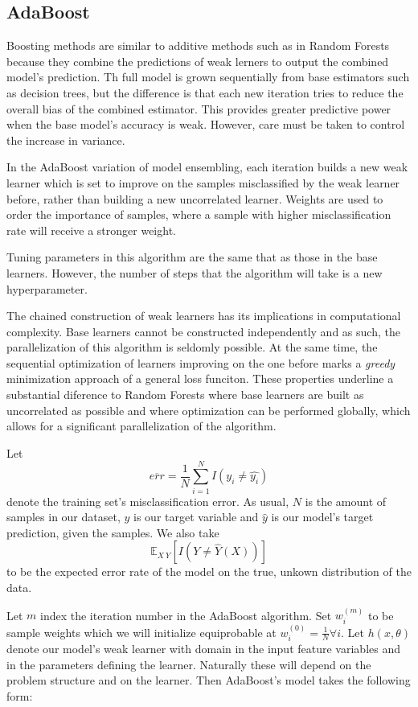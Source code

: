 \documentclass{article}%
\newcommand{\Expect}{{\mathbb{E}}}
\theoremstyle{definition}
\begin{document}
\subsection{AdaBoost}
\cite{schapire-adaBoost}

Boosting methods are similar to additive methods such as in Random Forests because they combine the predictions of weak lerners to output the combined model's prediction. Th full model is grown sequentially from base estimators such as decision trees, but the difference is that each new iteration tries to reduce the overall bias of the combined estimator. This provides greater predictive power when the base model's accuracy is weak. However, care must be taken to control the increase in variance.

In the AdaBoost variation of model ensembling, each iteration builds a new weak learner which is set to improve on the samples misclassified by the weak learner before, rather than building a new uncorrelated learner. Weights are used to order the importance of samples, where a sample with higher misclassification rate will receive a stronger weight. 

Tuning parameters in this algorithm are the same that as those in the base learners. However, the number of steps that the algorithm will take is a new hyperparameter. 

The chained construction of weak learners has its implications in computational complexity. Base learners cannot be constructed independently and as such, the parallelization of this algorithm is seldomly possible. At the same time, the sequential optimization of learners improving on the one before marks a \textit{greedy} minimization approach of a general loss funciton.
These properties underline a substantial diference to Random Forests where base learners are built as uncorrelated as possible and where optimization can be performed globally, which allows for a significant parallelization of the algorithm. 


Let 
$$\overline{err} = \frac{1}{N} \sum_{i=1}^{N} I(y_i \neq \hat{y_i})$$ \label{equation-adaBoostTrainingError}
denote the training set's misclassification error. As usual, $N$ is the amount of samples in our dataset, $y$ is our target variable and $\hat{y}$ is our model's target prediction, given the samples. We also take $$\Expect_{X \ Y} [ I(Y \neq \hat{Y}(X)) ]$$ 
 to be the expected error rate of the model on the true,  unkown distribution of the data.

Let $m$ index the iteration number in the AdaBoost algorithm. Set $w^{(m)}_i$ to be sample weights which we will initialize equiprobable at $w^{(0)}_i = \frac{1}{N} \forall i$. Let $h(x,\theta)$  denote our model's weak learner with domain in the input feature variables and in the parameters defining the learner. Naturally these will depend on the problem structure and on the learner. Then AdaBoost's model takes the following form:
\end{document}
